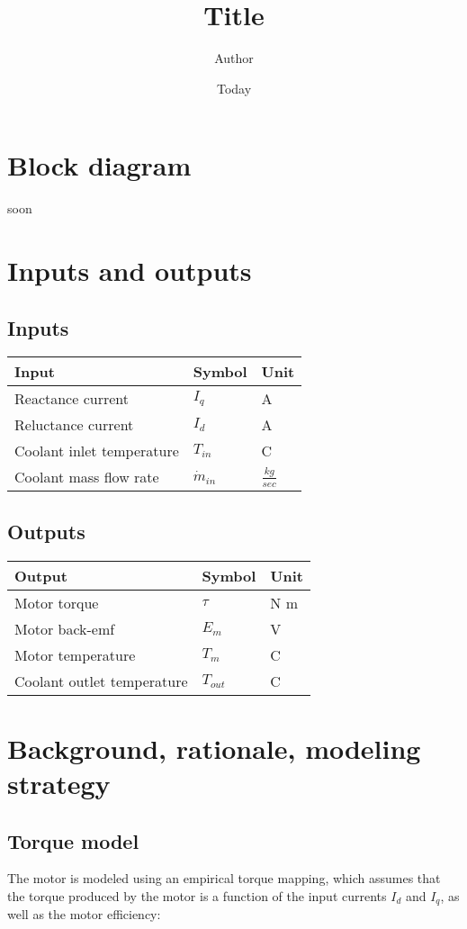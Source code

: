 \documentclass[]{article}
\begin{document}
\title{Title}
\author{Author}
\date{Today}
\maketitle

\section{Block diagram}
soon

\section{Inputs and outputs}
	\subsection{Inputs}
	\begin{tabular}{ l | l | l  }
		Input					&	Symbol		&	Unit		\\	\hline
		Reactance current		&	$I_q$		&	A		\\
		Reluctance current		&	$I_d$		&	A		\\
		Coolant inlet temperature	&	$T_{in}$		&	\degree C	\\
		Coolant mass flow rate	&	$\dot{m}_{in}$	&	$\frac{kg}{sec}$	 
	\end{tabular}
	
	\subsection{Outputs}
	\begin{tabular}{ l | l | l  }
		Output					&	Symbol		&	Unit		\\	\hline
		Motor torque				&	$\tau$		&	N m		\\
		Motor back-emf			&	$E_m$		&	V		\\
		Motor temperature			&	$T_{m}$		&	\degree C	\\
		Coolant outlet temperature	&	$T_{out}$		&	\degree C	
	\end{tabular}
	
\section{Background, rationale, modeling strategy}
	\subsection{Torque model}
		The motor is modeled using an empirical torque mapping, which assumes that the torque produced by the motor is a function of the input currents $I_d$ and $I_q$, as well as the motor efficiency:
	
\end{document}
